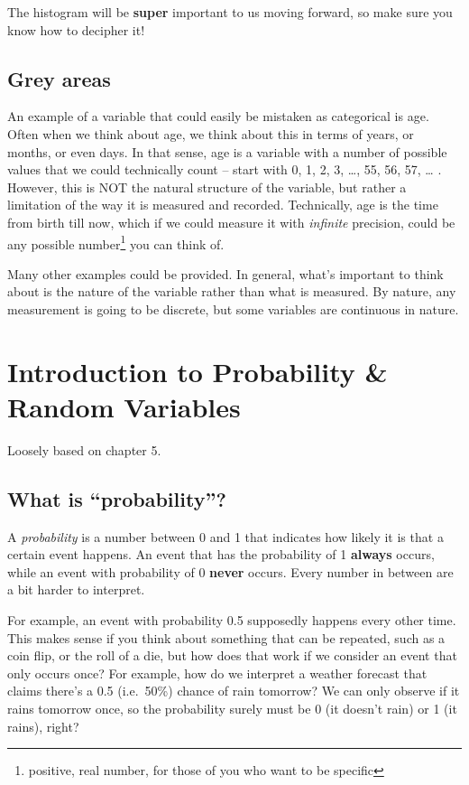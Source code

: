 \documentclass[]{book}
\let\rmarkdownfootnote\footnote%
\def\footnote{\protect\rmarkdownfootnote}
\theoremstyle{definition}
\theoremstyle{definition}
\theoremstyle{definition}
\theoremstyle{remark}
\begin{document}
The histogram will be \textbf{super} important to us moving forward, so make sure you know how to decipher it!

\hypertarget{grey-areas}{%
\chapter{Grey areas}\label{grey-areas}}

An example of a variable that could easily be mistaken as categorical is age. Often when we think about age, we think about this in terms of years, or months, or even days. In that sense, age is a variable with a number of possible values that we could technically count -- start with 0, 1, 2, 3, \ldots, 55, 56, 57, \ldots{} . However, this is NOT the natural structure of the variable, but rather a limitation of the way it is measured and recorded. Technically, age is the time from birth till now, which if we could measure it with \emph{infinite} precision, could be any possible number\footnote{positive, real number, for those of you who want to be specific} you can think of.

Many other examples could be provided. In general, what's important to think about is the nature of the variable rather than what is measured. By nature, any measurement is going to be discrete, but some variables are continuous in nature.

\hypertarget{part-introduction-to-probability-random-variables}{%
\part{Introduction to Probability \& Random Variables}\label{part-introduction-to-probability-random-variables}}

Loosely based on \citet{ls} chapter 5.

\hypertarget{what-is-probability}{%
\chapter{What is ``probability''?}\label{what-is-probability}}

A \emph{probability} is a number between 0 and 1 that indicates how likely it is that a certain event happens. An event that has the probability of 1 \textbf{always} occurs, while an event with probability of 0 \textbf{never} occurs. Every number in between are a bit harder to interpret.

For example, an event with probability 0.5 supposedly happens every other time. This makes sense if you think about something that can be repeated, such as a coin flip, or the roll of a die, but how does that work if we consider an event that only occurs once? For example, how do we interpret a weather forecast that claims there's a 0.5 (i.e.~50\%) chance of rain tomorrow? We can only observe if it rains tomorrow once, so the probability surely must be 0 (it doesn't rain) or 1 (it rains), right?
\end{document}
